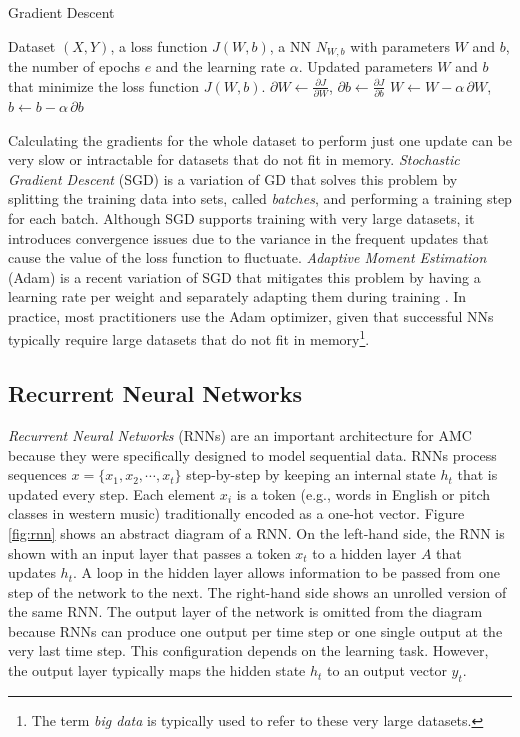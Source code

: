 \begin{algorithm}[t]
\caption{Gradient Descent}
\label{alg:grad_desc}
\begin{algorithmic}[1]
\REQUIRE Dataset $(X, Y)$, a loss function $J(W,b)$, a NN $N_{W,b}$ with
parameters $W$ and $b$, the number of epochs $e$ and the learning rate $\alpha$.
\ENSURE Updated parameters $W$ and $b$ that minimize the loss function $J(W,b)$.
       \STATE $\partial W \gets \frac{\partial J}{\partial W}$, $\partial b \gets \frac{\partial J}{\partial b}$ \label{line:grad}
       \STATE $W \gets W - \alpha \, \partial W$, $b \gets b - \alpha \, \partial b$ \label{line:update}
\ENDFOR
\end{algorithmic}
\end{algorithm}

Calculating the gradients for the whole dataset to perform just one update can be very slow or intractable for datasets that do not fit in memory. \textit{Stochastic Gradient Descent} (SGD) is a variation of GD that solves this problem by splitting the training data into sets, called \textit{batches}, and performing a training step for each batch. Although SGD supports training with very large datasets, it introduces convergence issues due to the variance in the frequent updates that cause the value of the loss function to fluctuate. \textit{Adaptive Moment Estimation} (Adam) is a recent variation of SGD that mitigates this problem by having a learning rate per weight and separately adapting them during training \cite{adam14}. In practice, most practitioners use the Adam optimizer, given that successful NNs typically require large datasets that do not fit in memory\footnote{The term \textit{big data} is typically used to refer to these very large datasets.}.

\subsection{Recurrent Neural Networks}
\label{sec:rnns}

\textit{Recurrent Neural Networks} (RNNs) are an important architecture for AMC because they were specifically designed to model sequential data. RNNs process sequences $x = \{x_1, x_2, \cdots, x_t\}$ step-by-step by keeping an internal state $h_t$ that is updated every step. Each element $x_i$ is a token (e.g., words in English or pitch classes in western music) traditionally encoded as a one-hot vector. Figure \ref{fig:rnn} shows an abstract diagram of a RNN. On the left-hand side, the RNN is shown with an input layer that passes a token $x_t$ to a hidden layer $A$ that updates $h_t$. A loop in the hidden layer allows information to be passed from one step of the network to the next. The right-hand side shows an unrolled version of the same RNN. The output layer of the network is omitted from the diagram because RNNs can produce one output per time step or one single output at the very last time step. This configuration depends on the learning task. However, the output layer typically maps the hidden state $h_t$ to an output vector $y_t$.

